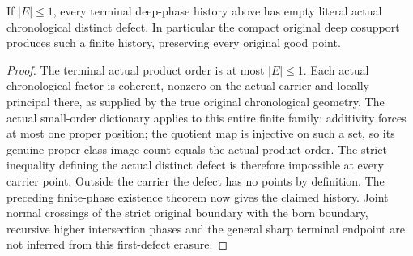\begin{theorem}
\label{hir:sharp-actual-finite-one-member-first-erasure}
If $|E|\leq1$, every terminal deep-phase history above has empty literal
actual chronological distinct defect. In particular the compact original
deep cosupport produces such a finite history, preserving every original
good point.
\end{theorem}
\begin{proof}
The terminal actual product order is at most $|E|\leq1$. Each actual
chronological factor is coherent, nonzero on the actual carrier and locally
principal there, as supplied by the true original chronological geometry.
The actual small-order dictionary applies to this entire finite family:
additivity forces at most one proper position; the quotient map is injective
on such a set, so its genuine proper-class image count equals the actual
product order. The strict inequality defining the actual distinct defect is
therefore impossible at every carrier point. Outside the carrier the defect
has no points by definition. The preceding finite-phase existence theorem
now gives the claimed history. Joint normal crossings of the strict original
boundary with the born boundary, recursive higher intersection phases and
the general sharp terminal endpoint are not inferred from this first-defect
erasure.
\leanok
\end{proof}
